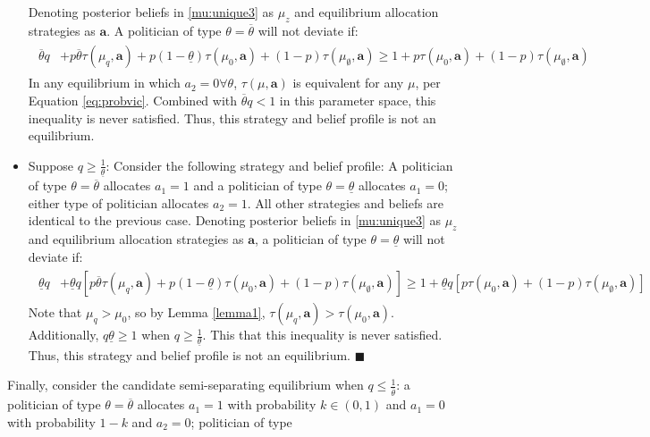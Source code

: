 \documentclass[11pt,english]{article}
\begin{document}
\begin{itemize}
Denoting posterior beliefs in \eqref{mu:unique3} as $\mu_z$ and equilibrium allocation strategies as $\boldsymbol{a}$. A politician of type $\theta = \overline{\theta}$ will not deviate if:
\begin{align*}
\begin{aligned}
\overline{\theta}q &+ p\overline{\theta}\tau(\mu_q,\boldsymbol{a}) +
p(1-\underline{\theta})\tau(\mu_0,\boldsymbol{a}) + (1-p)\tau(\mu_\emptyset,\boldsymbol{a}) \geq 1 + p\tau(\mu_0,\boldsymbol{a}) + (1-p)\tau(\mu_\emptyset,\boldsymbol{a})
\end{aligned}
\end{align*}
In any equilibrium in which $a_2 = 0 \forall \theta$, $\tau(\mu, \boldsymbol{a})$ is equivalent for any $\mu$, per Equation \ref{eq:probvic}. Combined with $\overline{\theta}q < 1$ in this parameter space, this inequality is never satisfied. Thus, this strategy and belief profile is not an equilibrium.
\item Suppose $q \geq \frac{1}{\underline{\theta}}$:
Consider the following strategy and belief profile: A politician of type $\theta = \overline{\theta}$ allocates $a_1 = 1$ and a politician of type $\theta = \underline{\theta}$ allocates $a_1 = 0$; either type of politician allocates $a_2 = 1$. All other strategies and beliefs are identical to the previous case. Denoting posterior beliefs in \eqref{mu:unique3} as $\mu_z$ and equilibrium allocation strategies as $\boldsymbol{a}$, a politician of type $\theta = \underline{\theta}$ will not deviate if:
\begin{align*}
\begin{aligned}
\underline{\theta}q &+ \underline{\theta}q\left[p\overline{\theta}\tau(\mu_q,\boldsymbol{a}) +
p(1-\underline{\theta})\tau(\mu_0,\boldsymbol{a}) + (1-p)\tau(\mu_\emptyset,\boldsymbol{a}) \right]\geq 1 + \underline{\theta}q\left[p\tau(\mu_0,\boldsymbol{a}) + (1-p)\tau(\mu_\emptyset,\boldsymbol{a})\right]
\end{aligned}
\end{align*}
Note that $\mu_q > \mu_0$, so by Lemma \ref{lemma1}, $\tau(\mu_q, \boldsymbol{a}) > \tau(\mu_0, \boldsymbol{a})$. Additionally, $q\underline{\theta} \geq 1$ when $q\geq\frac{1}{\underline{\theta}}$. This that this inequality is never satisfied. Thus, this strategy and belief profile is not an equilibrium. $\blacksquare$


\end{itemize}
Finally, consider the candidate semi-separating equilibrium when $q \leq \frac{1}{\overline{\theta}}$: a politician of type $\theta = \overline{\theta}$ allocates $a_1 = 1$ with probability $k \in (0,1)$ and $a_1 = 0$ with probability $1-k$ and $a_2 =0$; politician of type 
\end{document}
